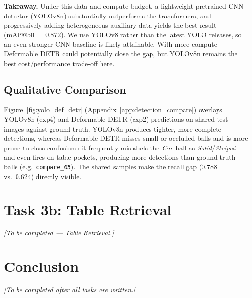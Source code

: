 \documentclass[conference, 10pt]{IEEEtran}
\begin{document}
\textbf{Takeaway.} Under this data and compute budget, a lightweight pretrained CNN detector (YOLOv8n) substantially outperforms the transformers, and progressively adding heterogeneous auxiliary data yields the best result (mAP@50 $=0.872$). We use YOLOv8 rather than the latest YOLO releases, so an even stronger CNN baseline is likely attainable. With more compute, Deformable DETR could potentially close the gap, but YOLOv8n remains the best cost/performance trade-off here.

\subsection{Qualitative Comparison}

Figure~\ref{fig:yolo_def_detr} (Appendix~\ref{app:detection_compare}) overlays YOLOv8n (exp4) and Deformable DETR (exp2) predictions on shared test images against ground truth.
YOLOv8n produces tighter, more complete detections, whereas Deformable DETR misses small or occluded balls and is more prone to class confusions: it frequently mislabels the \textit{Cue} ball as \textit{Solid}/\textit{Striped} and even fires on table pockets, producing more detections than ground-truth balls (e.g.\ \texttt{compare\_03}). The shared samples make the recall gap (0.788 vs.\ 0.624) directly visible.


\section{Task 3b: Table Retrieval}

\textit{[To be completed — Table Retrieval.]}


\section{Conclusion}

\textit{[To be completed after all tasks are written.]}

\end{document}
